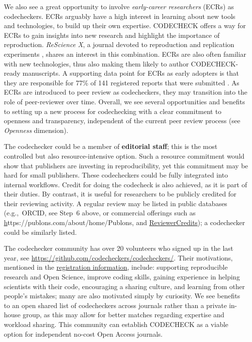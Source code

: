 \documentclass[12pt]{article}
\begin{document}
We also see a great opportunity to involve \emph{early-career
  researchers} (ECRs) as codecheckers.  ECRs arguably have a high
interest in learning about new tools and technologies, to build up
their own expertise.  CODECHECK offers a way for ECRs to gain insights
into new research and highlight the importance of reproduction.
\emph{ReScience X}, a journal devoted to reproduction and replication
experiments \cite{roesch_new_2020}, shares an interest in this
combination.  ECRs are also often familiar with new technologies, thus
also making them likely to author CODECHECK-ready manuscripts.  A
supporting data point for ECRs as early adopters is that they are
responsible for 77\% of 141 registered reports that were submitted
\cite{chambers_registered_2019}.  As ECRs are introduced to peer
review as codecheckers, they may transition into the role of
peer-reviewer over time.  Overall, we see several opportunities
and benefits to setting up a new process for codechecking with a clear
commitment to openness and transparency, independent of the current
peer review process (see \emph{Openness} dimension).

The codechecker could be a member of \textbf{editorial staff}; this is
the most controlled but also resource-intensive option.  Such a
resource commitment would show that publishers are investing in
reproducibility, yet this commitment may be hard for small publishers.
These codecheckers could be fully integrated into internal workflows.
Credit for doing the codecheck is also achieved, as it is part of
their duties.  By contrast, it is useful for researchers to be
publicly credited for their reviewing activity.  A regular review
may be listed in public databases (e.g.,~ORCID, see Step~6 above,
or commercial offerings such as \href{}https://publons.com/about/home/{Publons}, and
\href{https://www.reviewercredits.com/}{ReviewerCredits});
a codechecker could be similarly listed.

The codechecker community has over 20 volunteers who signed up in the last
year, see \url{https://github.com/codecheckers/codecheckers/}.  Their
motivations, mentioned in the \href{https://github.com/codecheckers/codecheckers/labels/registration}{registration
information},
include: supporting reproducible research and Open Science, improve
coding skills, gaining experience in helping scientists with their
code, encouraging a sharing culture, and learning from other people's
mistakes; many are also motivated simply by curiosity.  We see
benefits to an open shared list of codecheckers across journals rather
than a private in-house group, as this may allow for better matches
regarding expertise and workload sharing.  
This community can establish CODECHECK as a viable option
for independent no-cost Open Access journals.
\end{document}
